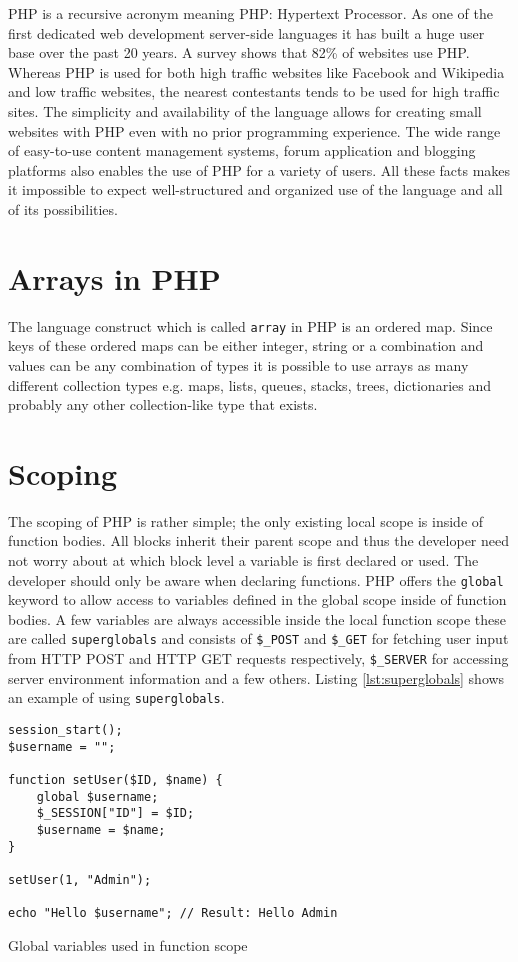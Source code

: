 PHP is a recursive acronym meaning PHP: Hypertext Processor. As one of the first dedicated web development server-side languages it has built a huge user base over the past 20 years. A survey shows that 82\% of websites use PHP. Whereas PHP is used for both high traffic websites like Facebook and Wikipedia and low traffic websites, the nearest contestants tends to be used for high traffic sites. The simplicity and availability of the language allows for creating small websites with PHP even with no prior programming experience. The wide range of easy-to-use content management systems, forum application and blogging platforms also enables the use of PHP for a variety of users. All these facts makes it impossible to expect well-structured and organized use of the language and all of its possibilities.

\section{Arrays in PHP}
The language construct which is called \texttt{array} in PHP is an ordered map. Since keys of these ordered maps can be either integer, string or a combination and values can be any combination of types it is possible to use arrays as many different collection types e.g. maps, lists, queues, stacks, trees, dictionaries and probably any other collection-like type that exists.

\section{Scoping}
\label{sec:backg_scoping}
The scoping of PHP is rather simple; the only existing local scope is inside of function bodies. All blocks inherit their parent scope and thus the developer need not worry about at which block level a variable is first declared or used. The developer should only be aware when declaring functions. PHP offers the \texttt{global} keyword to allow access to variables defined in the global scope inside of function bodies. A few variables are always accessible inside the local function scope these are called \texttt{superglobals} and consists of \texttt{\$\_POST} and \texttt{\$\_GET} for fetching user input from HTTP POST and HTTP GET requests respectively, \texttt{\$\_SERVER} for accessing server environment information and a few others. Listing \ref{lst:superglobals} shows an example of using \texttt{superglobals}.
\begin{program}
\begin{lstlisting}
session_start();
$username = "";

function setUser($ID, $name) {
    global $username;
    $_SESSION["ID"] = $ID;
    $username = $name;
}

setUser(1, "Admin");

echo "Hello $username"; // Result: Hello Admin
\end{lstlisting}
\caption{Global variables used in function scope}
\label{lst:superglobals}
\end{program}

